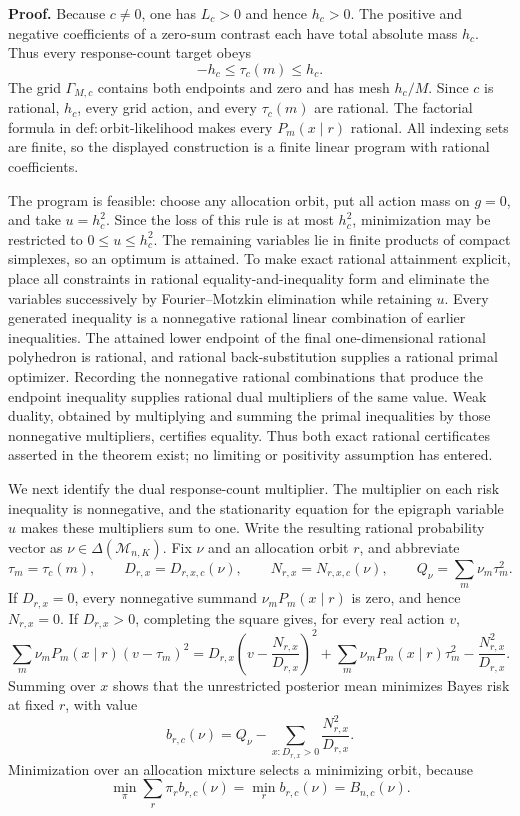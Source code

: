 \textbf{Proof.}
Because \(c\neq0\), one has \(L_c>0\) and hence \(h_c>0\).  The positive and negative coefficients of a zero-sum contrast each have total absolute mass \(h_c\).  Thus every response-count target obeys
\[
 -h_c\leq\tau_c(m)\leq h_c.
\]
The grid \(\Gamma_{M,c}\) contains both endpoints and zero and has mesh \(h_c/M\).  Since \(c\) is rational, \(h_c\), every grid action, and every \(\tau_c(m)\) are rational.  The factorial formula in \(\mathrm{def:orbit\text{-}likelihood}\) makes every \(P_m(x\mid r)\) rational.  All indexing sets are finite, so the displayed construction is a finite linear program with rational coefficients.

The program is feasible: choose any allocation orbit, put all action mass on \(g=0\), and take \(u=h_c^2\).  Since the loss of this rule is at most \(h_c^2\), minimization may be restricted to \(0\leq u\leq h_c^2\).  The remaining variables lie in finite products of compact simplexes, so an optimum is attained.  To make exact rational attainment explicit, place all constraints in rational equality-and-inequality form and eliminate the variables successively by Fourier--Motzkin elimination while retaining \(u\).  Every generated inequality is a nonnegative rational linear combination of earlier inequalities.  The attained lower endpoint of the final one-dimensional rational polyhedron is rational, and rational back-substitution supplies a rational primal optimizer.  Recording the nonnegative rational combinations that produce the endpoint inequality supplies rational dual multipliers of the same value.  Weak duality, obtained by multiplying and summing the primal inequalities by those nonnegative multipliers, certifies equality.  Thus both exact rational certificates asserted in the theorem exist; no limiting or positivity assumption has entered.

We next identify the dual response-count multiplier.  The multiplier on each risk inequality is nonnegative, and the stationarity equation for the epigraph variable \(u\) makes these multipliers sum to one.  Write the resulting rational probability vector as \(\nu\in\Delta(\mathcal M_{n,K})\).  Fix \(\nu\) and an allocation orbit \(r\), and abbreviate
\[
 \tau_m=\tau_c(m),\qquad
 D_{r,x}=D_{r,x,c}(\nu),\qquad
 N_{r,x}=N_{r,x,c}(\nu),\qquad
 Q_\nu=\sum_m\nu_m\tau_m^2.
\]
If \(D_{r,x}=0\), every nonnegative summand \(\nu_mP_m(x\mid r)\) is zero, and hence \(N_{r,x}=0\).  If \(D_{r,x}>0\), completing the square gives, for every real action \(v\),
\[
 \sum_m\nu_mP_m(x\mid r)(v-\tau_m)^2
 =D_{r,x}\left(v-\frac{N_{r,x}}{D_{r,x}}\right)^2
 +\sum_m\nu_mP_m(x\mid r)\tau_m^2
 -\frac{N_{r,x}^2}{D_{r,x}}.
\]
Summing over \(x\) shows that the unrestricted posterior mean minimizes Bayes risk at fixed \(r\), with value
\[
 b_{r,c}(\nu)=Q_\nu-
 \sum_{x:D_{r,x}>0}\frac{N_{r,x}^2}{D_{r,x}}.
\]
Minimization over an allocation mixture selects a minimizing orbit, because
\[
 \min_{\pi}\sum_r\pi_rb_{r,c}(\nu)=\min_rb_{r,c}(\nu)=B_{n,c}(\nu).
\]

